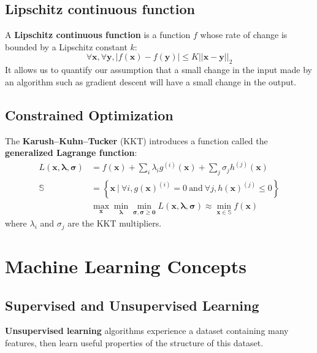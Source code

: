 \documentclass[12pt]{report}
\begin{document}
    \section{Lipschitz continuous function}
        A \textbf{Lipschitz continuous function} is a function $f$ whose rate
        of change is bounded by a Lipschitz constant $k$:
        \begin{equation}
            \forall \boldsymbol{x}, \forall \boldsymbol{y}, |f(\boldsymbol{x}) - f(\boldsymbol{y})| \leq K||\boldsymbol{x} - \boldsymbol{y}||_2
        \end{equation}
        It allows us to quantify our assumption that a small change in the input made by an algorithm such as gradient descent will have a small change in the output.
        
    \section{Constrained Optimization}
        The \textbf{Karush–Kuhn–Tucker} (KKT) introduces a function called the \textbf{generalized Lagrange function}:
        \begin{align}
            L(\boldsymbol{x}, \boldsymbol{\lambda}, \boldsymbol{\sigma}) &= f(\boldsymbol{x}) + \sum_i{\lambda_i g^{(i)}(\boldsymbol{x})} + \sum_j{\sigma_j h^{(j)}(\boldsymbol{x})} \\[7pt]
            \mathbb{S} &= \left\{\boldsymbol{x}~|~\forall i, g(\boldsymbol{x})^{(i)} = 0~\text{and}~\forall j, h(\boldsymbol{x})^{(j)} \leq 0\right\} \\[7pt]
            &\max_{\boldsymbol{x}}{\min_{\boldsymbol{\lambda}}{\min_{\boldsymbol{\sigma, \sigma \geq 0}}{L(\boldsymbol{x}, \boldsymbol{\lambda}, \boldsymbol{\sigma})}}} \approx \min_{\boldsymbol{x} \in \mathbb{S}}{f(\boldsymbol{x})}
        \end{align}
        where $\lambda_i$ and $\sigma_j$ are the KKT multipliers.
        
\chapter{Machine Learning Concepts}
    \section{Supervised and Unsupervised Learning}
        \textbf{Unsupervised learning} algorithms experience a dataset containing many features, then learn useful properties of the structure of this dataset.
        
\end{document}
